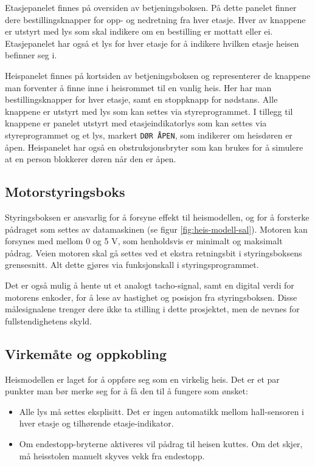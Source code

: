 \begin{alphasection}
Etasjepanelet finnes på oversiden av betjeningsboksen. På dette panelet finner dere bestillingsknapper for opp- og nedretning fra hver etasje. Hver av knappene er utstyrt med lys som skal indikere om en bestilling er mottatt eller ei. Etasjepanelet har også et lys for hver etasje for å indikere hvilken etasje heisen befinner seg i.

Heispanelet finnes på kortsiden av betjeningsboksen og representerer de knappene man forventer å finne inne i heisrommet til en vanlig heis. Her har man bestillingsknapper for hver etasje, samt en stoppknapp for nødstans. Alle knappene er utstyrt med lys som kan settes via styreprogrammet. I tillegg til knappene er panelet utstyrt med etasjeindikatorlys som kan settes via styreprogrammet og et lys, markert \verb|DØR ÅPEN|, som indikerer om heisdøren er åpen. Heispanelet har også en obstruksjonsbryter som kan brukes for å simulere at en person blokkerer døren når den er åpen.

\subsection{Motorstyringsboks}

Styringsboksen er ansvarlig for å forsyne effekt til heismodellen, og for å forsterke pådraget som settes av datamaskinen (se figur \ref{fig:heis-modell-sal}). Motoren kan forsynes med mellom 0 og 5 V, som henholdsvis er minimalt og maksimalt pådrag. Veien motoren skal gå settes ved et ekstra retningsbit i styringsboksens grensesnitt. Alt dette gjøres via funksjonskall i styringsprogrammet. 

Det er også mulig å hente ut et analogt tacho-signal, samt en digital verdi for motorens enkoder, for å lese av hastighet og posisjon fra styringsboksen. Disse målesignalene trenger dere ikke ta stilling i dette prosjektet, men de nevnes for fullstendighetens skyld.

\subsection{Virkemåte og oppkobling}
Heismodellen er laget for å oppføre seg som en virkelig heis. Det er et par punkter man bør merke seg for å få den til å fungere som ønsket:

\begin{itemize}
    \item Alle lys må settes eksplisitt. Det er ingen automatikk mellom hall-sensoren i hver etasje og tilhørende etasje-indikator.
    \item Om endestopp-bryterne aktiveres vil pådrag til heisen kuttes. Om det skjer, må heisstolen manuelt skyves vekk fra endestopp.
    

\end{itemize}
\end{alphasection}
